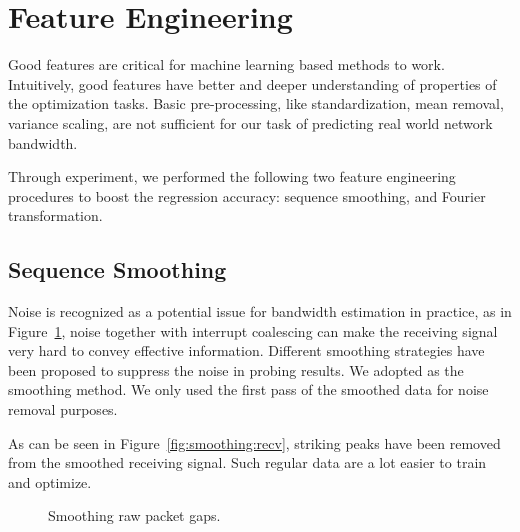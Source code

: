 \section{Feature Engineering}
\label{sec:feature_engineering}
Good features are critical for machine learning based methods to work.
Intuitively, good features have better and deeper understanding of properties
of the optimization tasks. Basic pre-processing, like standardization, mean
removal, variance scaling, are not sufficient for our task of predicting real
world network bandwidth.

Through experiment, we performed the following two feature engineering
procedures to boost the regression accuracy: sequence smoothing, and Fourier
transformation.

\subsection{Sequence Smoothing}
\label{sub:sequence_smoothing}
Noise is recognized as a potential issue for bandwidth estimation in practice,
as in Figure~\ref{fig:smoothing}, noise together with interrupt coalescing
can make the receiving signal very hard to convey effective information.
Different smoothing strategies have been proposed to suppress the noise in
probing results. We adopted \cite{Yin2014} as the smoothing method. We only
used the first pass of the smoothed data for noise removal purposes.

As can be seen in Figure~\ref{fig:smoothing:recv}, striking peaks have been
removed from the smoothed receiving signal. Such regular data are a lot easier
to train and optimize.

\begin{figure}[htpb]
   \centering
   \quad
   \caption{Smoothing raw packet gaps.}
   \label{fig:smoothing}
\end{figure}

